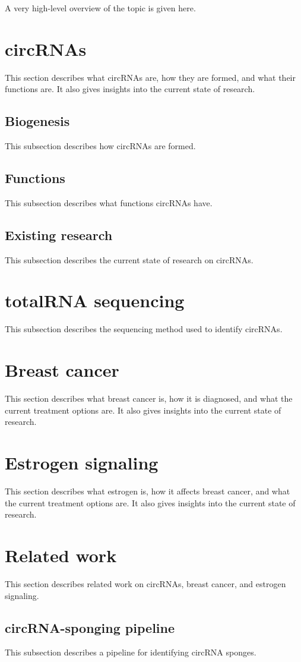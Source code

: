 A very high-level overview of the topic is given here.

\lipsum[1]

\section{circRNAs}
This section describes what circRNAs are, how they are formed, and what their functions are.
It also gives insights into the current state of research.

\subsection{Biogenesis}
This subsection describes how circRNAs are formed.

\subsection{Functions}
This subsection describes what functions circRNAs have.

\subsection{Existing research}
This subsection describes the current state of research on circRNAs.

\section{totalRNA sequencing}
This subsection describes the sequencing method used to identify circRNAs.

\lipsum[2]

\section{Breast cancer}
This section describes what breast cancer is, how it is diagnosed, and what the current treatment options are.
It also gives insights into the current state of research.

\lipsum[3]

\section{Estrogen signaling}
This section describes what estrogen is, how it affects breast cancer, and what the current treatment options are.
It also gives insights into the current state of research.

\lipsum[4]

\section{Related work}
This section describes related work on circRNAs, breast cancer, and estrogen signaling.

\subsection{circRNA-sponging pipeline}
This subsection describes a pipeline for identifying circRNA sponges.